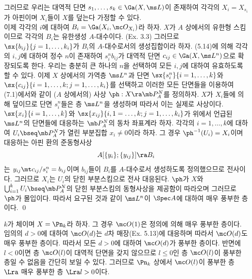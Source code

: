 \begin{theorem}
	그러므로 우리는 대역적 단면 $s_1,\ldots,s_k\in\Ga(X,\ms L)$이 존재하여
	각각의 $X_i=X_{s_i}$가 아핀이며 $X_i$들이 $X$를 덮는다 가정할 수 있다.\\
	이제 각각의 $i$에 대하여 $B_i=\Ga(X_i,\mc O_{X_i})$라 하자.
	$X$가 $A$ 상에서의 유한형 스킴이므로 각각의 $B_i$는 유한생성 $A$-대수이다. (Ex. 3.3)
	그러므로 $\sx{b_{ij}}{j=1,\ldots,k_i}$가 $B_i$의 $A$-대수로서의 생성집합이라 하자.
	(5.14)에 의해 각각의 $i,j$에 대하여 정수 $n$이 존재하여 $s_i^nb_{ij}$가
	대역적 단면 $c_{ij}\in\Ga(X,\ms L^n)$으로 확장되도록 한다.
	우리는 충분히 큰 하나의 $n$을 선택하여 모든 $i,j$에 대하여 유효하도록 할 수 있다.
	이제 $X$ 상에서의 가역층 $\ms L^n$과 단면 $\sx{s_i^n}{i=1,\ldots,k}$와 $\sx{c_{ij}}{i=1,\ldots,k;j=1,\ldots,k_i}$를 선택하고
	이러한 모든 단면들을 이용하여 (7.1)에서와 같이 ($A$ 상에서의) 사상 $\ph:X\ra\mb P^N_A$를 정의하자.
	$X$가 $X_i$들에 의해 덮이므로 단면 $s_i^n$들은 층 $\ms L^n$을 생성하며 따라서 이는 실제로 사상이다.\\
	$\sx{x_i}{i=1,\ldots,k}$와 $\sx{x_{ij}}{i,1=\ldots,k;j=1,\ldots,k_i}$가 위에서 언급된 $\ms L^n$의 단면들에 대응하는
	$\mb P^N_A$의 동차 좌표계라 하자. 각각의 $i=1,\ldots,k$에 대하여 $U_i\bseq\mb P^N_A$가 열린 부분집합 $x_i\ne 0$이라 하자.
	그 경우 $\ph^{-1}(U_i)=X_i$이며 대응하는 아핀 환의 준동형사상
	$$A[\{y_i\};\{y_{ij}\}]\ra B_i$$
	는 $y_{ij}\mt c_{ij}/s_i^n=b_{ij}$이며 $b_{ij}$들이 $B_i$를 $A$-대수로서 생성하도록 정의했으므로 전사이다.
	그러므로 $X_i$는 $U_i$의 닫힌 부분스킴으로 전사 대응된다.
	$\ph$가 $X$와 $\bigcup_{i=1}^kU_i\bseq\mb P^N_A$의 닫힌 부분스킴의 동형사상을 제공함이 따라오며 그러므로 $\ph$가 몰입이다.
	따라서 요구된 것과 같이 $\ms L^n$이 $\Spec A$에 대하여 매우 풍부한 층이다.
	\qed
	\end{theorem}
	
	
	\begin{example}
	$k$가 체이며 $X=\Pn_k$라 하자. 그 경우 $\mc O(1)$은 정의에 의해 매우 풍부한 층이다.
	임의의 $d>0$에 대하여 $\mc O(d)$는 $d$차 매장(Ex. 5.13)에 대응하며 따라서 $\mc O(d)$도 매우 풍부한 층이다.
	따라서 모든 $d>0$에 대하여 $\mc O(d)$가 풍부한 층이다.
	반면에 $l<0$이면 층 $\mc O(l)$이 대역적 단면을 갖지 않으므로 $l\le 0$인 층 $\mc O(l)$이 풍부한 층일 수 없음을 간단히 보일 수 있다.
	그러므로 $\Pn_k$ 상에서 $\mc O(l)$이 풍부한 층 $\Lra$ 매우 풍부한 층 $\Lra l>0$이다.
	\end{example}
	
